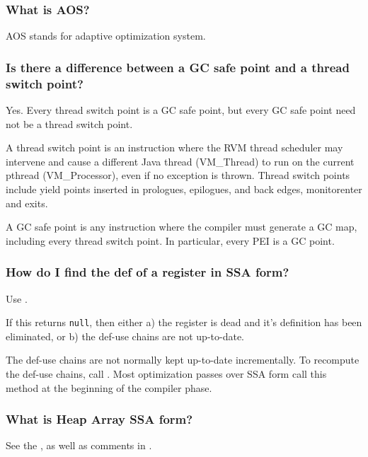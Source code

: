 \subsubsection{What is AOS?}
AOS stands for adaptive optimization system.

\subsubsection{Is there a difference between a GC safe point and a thread
switch point?}

Yes.  Every thread switch point is a GC safe point, but every GC safe point 
need not be a thread switch point.

A thread switch point is an instruction where the RVM thread scheduler may
intervene and cause a different Java\TMweb{} thread (VM\_Thread) to
run on the current 
pthread (VM\_Processor), even if no exception is thrown.  
Thread switch points include yield points inserted in prologues, epilogues, 
and back edges, monitorenter and exits.

A GC safe point is any instruction where the compiler must generate a GC map, 
including every thread switch point.  In particular, every 
PEI is a GC point.

\subsubsection{How do I find the def of a register in SSA form?}

Use 
.

If this returns {\tt null}, then either a) the register is dead and it's definition has been eliminated, 
or b) the def-use chains are not up-to-date.

The def-use chains are not normally kept up-to-date incrementally.  To
recompute the def-use chains, call 
. 
Most optimization passes over SSA form call this method at 
the beginning of the compiler phase.

\subsubsection{What is Heap Array SSA form?}
See the , as well as comments in
.

